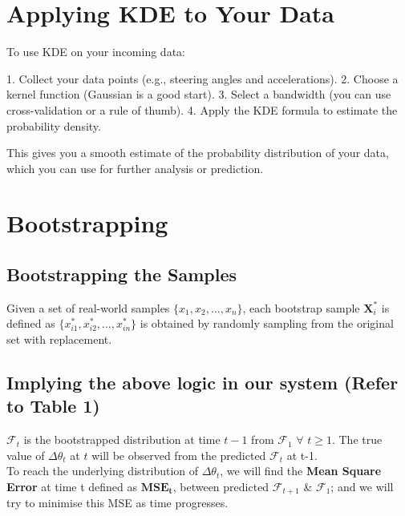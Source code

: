 \documentclass[conference]{IEEEtran}
\begin{document}
\section{Applying KDE to Your Data}

To use KDE on your incoming data:

1. Collect your data points (e.g., steering angles and accelerations).
2. Choose a kernel function (Gaussian is a good start).
3. Select a bandwidth (you can use cross-validation or a rule of thumb).
4. Apply the KDE formula to estimate the probability density.

This gives you a smooth estimate of the probability distribution of your data, which you can use for further analysis or prediction.

\section{Bootstrapping}
\subsection{Bootstrapping the Samples}

Given a set of real-world samples \( \{x_1, x_2, \ldots, x_n\} \), each bootstrap sample \(\mathbf{X}_i^*\) is defined as \( \{x_{i1}^*, x_{i2}^*, \ldots, x_{in}^*\} \) is obtained by randomly sampling from the original set with replacement. 


\subsection{Implying the above logic in our system (Refer to Table 1)}

$\mathcal{F}_{t}$ is the bootstrapped distribution at time $t-1$ from $\mathcal{F}_{1}$ $\forall$ $t \geq 1$. The true value of $\Delta \theta_t$ at $t$ will be observed from the predicted $\mathcal{F}_{t}$ at t-1. \\
To reach the underlying distribution of $\Delta \theta_t$, we will find the \textbf{Mean Square Error} at time t defined as $\textbf{MSE}_\textbf{t}$, between predicted $\mathcal{F}_{t+1}$ \& $\mathcal{F}_{1}$; and we will try to minimise this MSE as time progresses.
\end{document}
